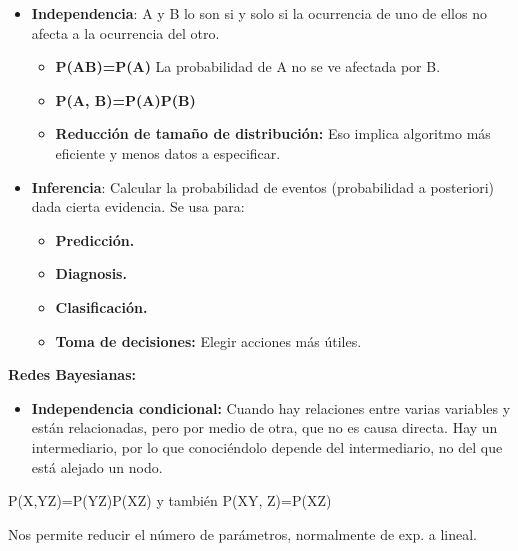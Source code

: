 \documentclass[12pt, twoside, openright]{report} %
\begin{document}
\begin{itemize}
\begin{itemize}
    \end{itemize}
  \item \textbf{Independencia}: A y B lo son si y solo si la ocurrencia de
    uno de ellos no afecta a la ocurrencia del otro.
    

    \begin{itemize}
    \item \textbf{P(A\textbar B)=P(A)} La probabilidad de A no se ve
      afectada por B.
      
    \item \textbf{P(A, B)=P(A)P(B)}
      
    \item \textbf{Reducción de tamaño de distribución:} Eso implica
      algoritmo más eficiente y menos datos a especificar.
      
    \end{itemize}
  \item \textbf{Inferencia}: Calcular la probabilidad de eventos
    (probabilidad a posteriori) dada cierta evidencia. Se usa para:
    

    \begin{itemize}
    \item \textbf{Predicción.}
      
    \item \textbf{Diagnosis.}
      
    \item \textbf{Clasificación.}
      
    \item \textbf{Toma de decisiones:} Elegir acciones más útiles.
      
    \end{itemize}
  \end{itemize}

 \pagebreak
  \textbf{Redes Bayesianas:}
  

  \begin{itemize}
  \item \textbf{Independencia condicional:} Cuando hay relaciones entre
    varias variables y están relacionadas, pero por medio de otra, que
    no es causa directa. Hay un intermediario, por lo que conociéndolo
    depende del intermediario, no del que está alejado un nodo.
    
  \end{itemize}

  
P(X,Y\textbar Z)=P(Y\textbar Z)P(X\textbar Z) y también P(X\textbar Y,
Z)=P(X\textbar Z)

Nos permite reducir el número de parámetros, normalmente de exp. a
lineal.
\end{document}

